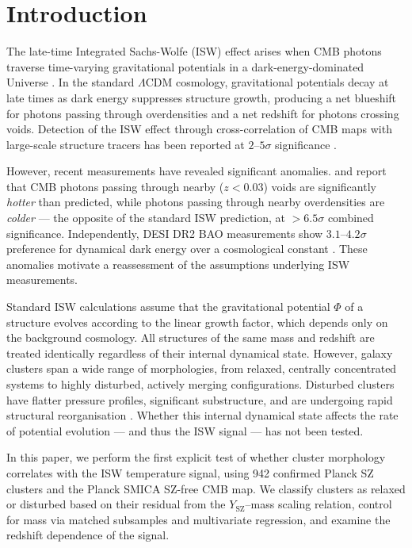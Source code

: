 \documentclass[twocolumn]{article}
\begin{document}
\section{Introduction}
\label{sec:intro}

The late-time Integrated Sachs-Wolfe (ISW) effect arises when CMB
photons traverse time-varying gravitational potentials in a
dark-energy-dominated Universe \citep{sachs1967,crittenden1996}.
In the standard $\Lambda$CDM cosmology, gravitational potentials
decay at late times as dark energy suppresses structure growth,
producing a net blueshift for photons passing through overdensities
and a net redshift for photons crossing voids.
Detection of the ISW effect through cross-correlation of CMB maps
with large-scale structure tracers has been reported at
$2$--$5\sigma$ significance
\citep{granett2008,planckisw2016}.

However, recent measurements have revealed significant anomalies.
\citet{hansen2024} and \citet{hansen2026} report that CMB photons
passing through nearby ($z < 0.03$) voids are significantly
\emph{hotter} than predicted, while photons passing through nearby
overdensities are \emph{colder} --- the opposite of the standard
ISW prediction, at $> 6.5\sigma$ combined significance.
Independently, DESI DR2 BAO measurements show $3.1$--$4.2\sigma$
preference for dynamical dark energy over a cosmological constant
\citep{desi2025}.
These anomalies motivate a reassessment of the assumptions
underlying ISW measurements.

Standard ISW calculations assume that the gravitational potential
$\Phi$ of a structure evolves according to the linear growth factor,
which depends only on the background cosmology.
All structures of the same mass and redshift are treated identically
regardless of their internal dynamical state.
However, galaxy clusters span a wide range of morphologies, from
relaxed, centrally concentrated systems to highly disturbed,
actively merging configurations.
Disturbed clusters have flatter pressure profiles, significant
substructure, and are undergoing rapid structural reorganisation
\citep{lovisari2017}.
Whether this internal dynamical state affects the rate of potential
evolution --- and thus the ISW signal --- has not been tested.

In this paper, we perform the first explicit test of whether cluster
morphology correlates with the ISW temperature signal, using 942
confirmed Planck SZ clusters and the Planck SMICA SZ-free CMB map.
We classify clusters as relaxed or disturbed based on their residual
from the $Y_{\mathrm{SZ}}$--mass scaling relation, control for mass
via matched subsamples and multivariate regression, and examine the
redshift dependence of the signal.
\end{document}
